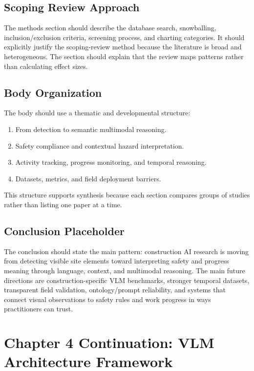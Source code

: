 \documentclass[10pt,letterpaper]{article}
\begin{document}
\subsection{Scoping Review Approach}

The methods section should describe the database search, snowballing, inclusion/exclusion criteria, screening process, and charting categories. It should explicitly justify the scoping-review method because the literature is broad and heterogeneous. The section should explain that the review maps patterns rather than calculating effect sizes.

\subsection{Body Organization}

The body should use a thematic and developmental structure:

\begin{enumerate}
\item From detection to semantic multimodal reasoning.
\item Safety compliance and contextual hazard interpretation.
\item Activity tracking, progress monitoring, and temporal reasoning.
\item Datasets, metrics, and field deployment barriers.
\end{enumerate}

This structure supports synthesis because each section compares groups of studies rather than listing one paper at a time.

\subsection{Conclusion Placeholder}

The conclusion should state the main pattern: construction AI research is moving from detecting visible site elements toward interpreting safety and progress meaning through language, context, and multimodal reasoning. The main future directions are construction-specific VLM benchmarks, stronger temporal datasets, transparent field validation, ontology/prompt reliability, and systems that connect visual observations to safety rules and work progress in ways practitioners can trust.

\section{Chapter 4 Continuation: VLM Architecture Framework}
\end{document}
